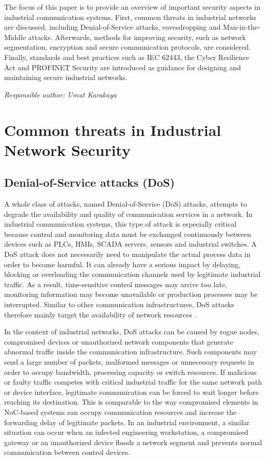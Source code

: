 \documentclass[conference]{IEEEtran}
\begin{document}
The focus of this paper is to provide an overview of important security aspects in industrial communication systems. First, common threats in industrial networks are discussed, including Denial-of-Service attacks, eavesdropping and Man-in-the-Middle attacks. Afterwards, methods for improving security, such as network segmentation, encryption and secure communication protocols, are considered. Finally, standards and best practices such as IEC 62443, the Cyber Resilience Act and PROFINET Security are introduced as guidance for designing and maintaining secure industrial networks. 

\textit{Responsible author: Umut Karakaya}


\section{Common threats in Industrial Network Security}


\subsection{Denial-of-Service attacks (DoS)}
A whole class of attacks, named Denial-of-Service (DoS) attacks, attempts to degrade the availability and quality of communication services in a network. In industrial communication systems, this type of attack is especially critical because control and monitoring data must be exchanged continuously between devices such as PLCs, HMIs, SCADA servers, sensors and industrial switches. A DoS attack does not necessarily need to manipulate the actual process data in order to become harmful. It can already have a serious impact by delaying, blocking or overloading the communication channels used by legitimate industrial traffic. As a result, time-sensitive control messages may arrive too late, monitoring information may become unavailable or production processes may be interrupted. Similar to other communication infrastructures, DoS attacks therefore mainly target the availability of network resources \cite{b2}. 

In the context of industrial networks, DoS attacks can be caused by rogue nodes, compromised devices or unauthorized network components that generate abnormal traffic inside the communication infrastructure. Such components may send a large number of packets, malformed messages or unnecessary requests in order to occupy bandwidth, processing capacity or switch resources. If malicious or faulty traffic competes with critical industrial traffic for the same network path or device interface, legitimate communication can be forced to wait longer before reaching its destination. This is comparable to the way compromised elements in NoC-based systems can occupy communication resources and increase the forwarding delay of legitimate packets\cite{b2}. In an industrial environment, a similar situation can occur when an infected engineering workstation, a compromised gateway or an unauthorized device floods a network segment and prevents normal communication between control devices. 
\end{document}
